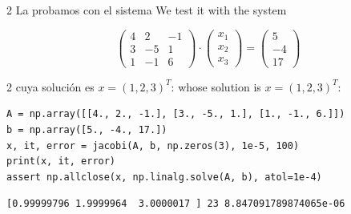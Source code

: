 \begin{paracol}{2}
La probamos con el sistema
\switchcolumn
We test it with the system
\end{paracol}

\begin{equation*}
\begin{pmatrix}
4& 2& -1\\
3& -5& 1\\
1& -1& 6
\end{pmatrix}\cdot \begin{pmatrix}
x_1\\
x_2\\
x_3
\end{pmatrix}=\begin{pmatrix}
5\\
-4\\
17
\end{pmatrix}
\end{equation*}

\begin{paracol}{2}
cuya solución es $x=(1, 2, 3)^T$:
\switchcolumn
whose solution is $x=(1, 2, 3)^T$:
\end{paracol}
\begin{verbatim}
A = np.array([[4., 2., -1.], [3., -5., 1.], [1., -1., 6.]])
b = np.array([5., -4., 17.])
x, it, error = jacobi(A, b, np.zeros(3), 1e-5, 100)
print(x, it, error)
assert np.allclose(x, np.linalg.solve(A, b), atol=1e-4)
\end{verbatim}
\begin{verbatim}
[0.99999796 1.9999964  3.0000017 ] 23 8.847091789874065e-06
\end{verbatim}


